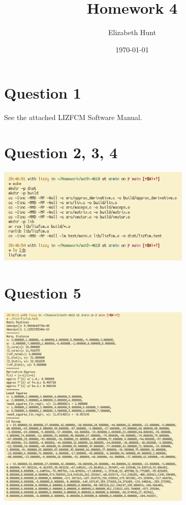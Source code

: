 \documentclass[11pt]{article}
\author{Elizabeth Hunt}
\date{\today}
\title{Homework 4}
\begin{document}
\maketitle
\setlength\parindent{0pt}

\section{Question 1}
\label{sec:org0ce46da}
See the attached LIZFCM Software Manual.

\section{Question 2, 3, 4}
\label{sec:org0794d50}
\begin{center}
\includegraphics[width=350px]{./img/make_run.png}
\end{center}

\section{Question 5}
\label{sec:orgf7b84cc}
\begin{center}
\includegraphics[width=350px]{./img/test_routine_1.png}
\end{center}
\end{document}
